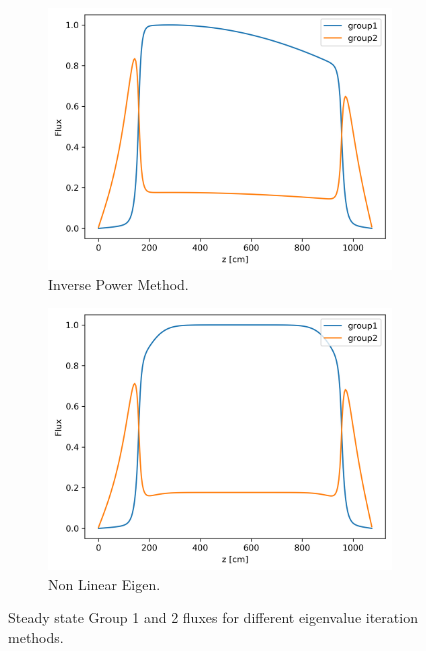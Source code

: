 \documentclass[11pt,letterpaper]{article}
\begin{document}
	\begin{figure}[htbp!]
		\centering
		\begin{subfigure}[t]{0.4\textwidth}
			\centering
			\includegraphics[width=\linewidth]{1D-fuel-reflec-eig1C}
			\caption{Inverse Power Method.}
		\end{subfigure}
		\begin{subfigure}[t]{0.4\textwidth}
			\centering
			\includegraphics[width=\linewidth]{1D-fuel-reflec-eig2B}
			\caption{Non Linear Eigen.}
		\end{subfigure}
		\hfill
		\caption{Steady state Group 1 and 2 fluxes for different eigenvalue iteration methods.}
		\label{fig:1D-fuel-reflec-eig2}
	\end{figure}
\end{document}
